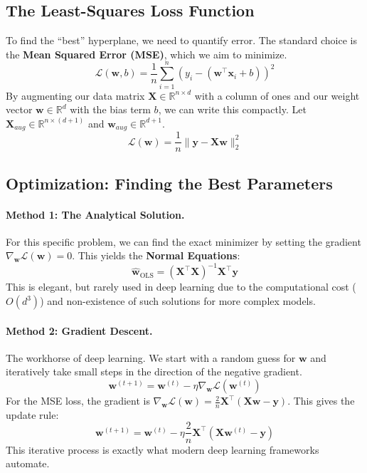 \documentclass{article}
\newcommand{\R}{\mathbb{R}}
\newcommand{\w}{\mathbf{w}}
\newcommand{\x}{\mathbf{x}}
\newcommand{\y}{\mathbf{y}}
\newcommand{\X}{\mathbf{X}}
\newcommand{\loss}{\mathcal{L}}
\newcommand{\T}{^\top}
\begin{document}
\subsection{The Least-Squares Loss Function}

To find the ``best'' hyperplane, we need to quantify error. The standard choice is the \textbf{Mean Squared Error (MSE)}, which we aim to minimize.
\begin{equation}
    \loss(\w, b) = \frac{1}{n} \sum_{i=1}^n (y_i - (\w\T\x_i + b))^2
\end{equation}
By augmenting our data matrix $\X \in \R^{n \times d}$ with a column of ones and our weight vector $\w \in \R^d$ with the bias term $b$, we can write this compactly. Let $\X_{aug} \in \R^{n \times (d+1)}$ and $\w_{aug} \in \R^{d+1}$.
\begin{equation}
    \loss(\w) = \frac{1}{n} \|\y - \X\w\|_2^2
\end{equation}

\subsection{Optimization: Finding the Best Parameters}

\paragraph{Method 1: The Analytical Solution.} For this specific problem, we can find the exact minimizer by setting the gradient $\nabla_\w \loss(\w) = 0$. This yields the \textbf{Normal Equations}:
\begin{equation}
    \hat{\w}_{\text{OLS}} = (\X\T\X)^{-1}\X\T\y
\end{equation}
This is elegant, but rarely used in deep learning due to the computational cost ($O(d^3)$) and non-existence of such solutions for more complex models.

\paragraph{Method 2: Gradient Descent.} The workhorse of deep learning. We start with a random guess for $\w$ and iteratively take small steps in the direction of the negative gradient.
\begin{equation}
    \w^{(t+1)} = \w^{(t)} - \eta \nabla_\w \loss(\w^{(t)})
\end{equation}
For the MSE loss, the gradient is $\nabla_\w \loss(\w) = \frac{2}{n}\X\T(\X\w - \y)$. This gives the update rule:
\begin{equation}
    \w^{(t+1)} = \w^{(t)} - \eta \frac{2}{n}\X\T(\X\w^{(t)} - \y)
\end{equation}
This iterative process is exactly what modern deep learning frameworks automate.
\end{document}
